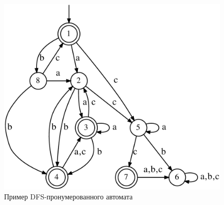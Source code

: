\begin{figure}[ht]
  \centering
  \includegraphics[scale=0.12]{img/datamod/DFS-example.eps}
  \caption{Пример DFS-пронумерованного автомата}
  \label{img:dfs-ex}
\end{figure}


